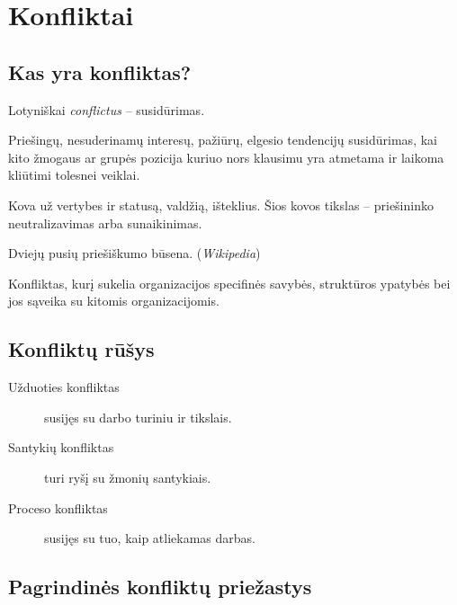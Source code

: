 \chapter{Konfliktai}

\section{Kas yra konfliktas?}

Lotyniškai \emph{conflictus} – susidūrimas.

\begin{defn}[Konfliktas]
  Priešingų, nesuderinamų interesų, pažiūrų, elgesio tendencijų
  susidūrimas, kai kito žmogaus ar grupės pozicija kuriuo nors
  klausimu yra atmetama ir laikoma kliūtimi tolesnei veiklai.
\end{defn}


\begin{defn}[Konfliktas]
  Kova už vertybes ir statusą, valdžią, išteklius. Šios kovos tikslas
  – priešininko neutralizavimas arba sunaikinimas.
\end{defn}

\begin{defn}[Konfliktas]
  Dviejų pusių priešiškumo būsena. (\emph{Wikipedia})
\end{defn}

\begin{defn}
  Konfliktas, kurį sukelia organizacijos specifinės savybės,
  struktūros ypatybės bei jos sąveika su kitomis organizacijomis.
\end{defn}

\section{Konfliktų rūšys}

\begin{description}
  \item[Užduoties konfliktas] susijęs su darbo turiniu ir tikslais.
  \item[Santykių konfliktas] turi ryšį su žmonių santykiais.
  \item[Proceso konfliktas] susijęs su tuo, kaip atliekamas darbas.
\end{description}

\section{Pagrindinės konfliktų priežastys}

